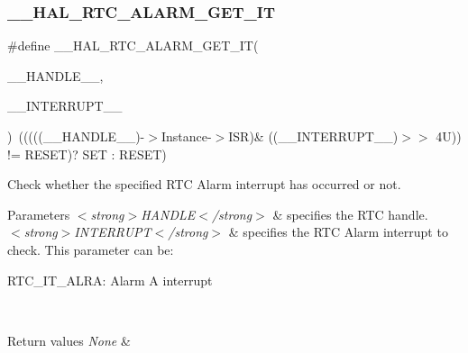 \subsubsection{\texorpdfstring{\+\_\+\+\_\+\+H\+A\+L\+\_\+\+R\+T\+C\+\_\+\+A\+L\+A\+R\+M\+\_\+\+G\+E\+T\+\_\+\+IT}{\_\_HAL\_RTC\_ALARM\_GET\_IT}}
{\footnotesize\ttfamily \#define \+\_\+\+\_\+\+H\+A\+L\+\_\+\+R\+T\+C\+\_\+\+A\+L\+A\+R\+M\+\_\+\+G\+E\+T\+\_\+\+IT(\begin{DoxyParamCaption}\item[{}]{\+\_\+\+\_\+\+H\+A\+N\+D\+L\+E\+\_\+\+\_\+,  }\item[{}]{\+\_\+\+\_\+\+I\+N\+T\+E\+R\+R\+U\+P\+T\+\_\+\+\_\+ }\end{DoxyParamCaption})~(((((\+\_\+\+\_\+\+H\+A\+N\+D\+L\+E\+\_\+\+\_\+)-\/$>$Instance-\/$>$I\+SR)\& ((\+\_\+\+\_\+\+I\+N\+T\+E\+R\+R\+U\+P\+T\+\_\+\+\_\+)$>$$>$ 4\+U)) != R\+E\+S\+E\+T)? S\+E\+T \+: R\+E\+S\+E\+T)}



Check whether the specified R\+TC Alarm interrupt has occurred or not. 


\begin{DoxyParams}{Parameters}
{\em $<$strong$>$\+H\+A\+N\+D\+L\+E$<$/strong$>$} & specifies the R\+TC handle. \\
\hline
{\em $<$strong$>$\+I\+N\+T\+E\+R\+R\+U\+P\+T$<$/strong$>$} & specifies the R\+TC Alarm interrupt to check. This parameter can be\+: \begin{DoxyItemize}
\item R\+T\+C\+\_\+\+I\+T\+\_\+\+A\+L\+RA\+: Alarm A interrupt \end{DoxyItemize}
\\
\hline
\end{DoxyParams}

\begin{DoxyRetVals}{Return values}
{\em None} & \\
\hline
\end{DoxyRetVals}
\mbox{\label{group___r_t_c___exported___macros_ga8068a537190e4c142b6d5bf41252ed01}} 
